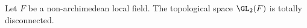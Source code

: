 Let $F$ be a non-archimedean local field. The topological space $\GL_2(F)$ is totally disconnected.
